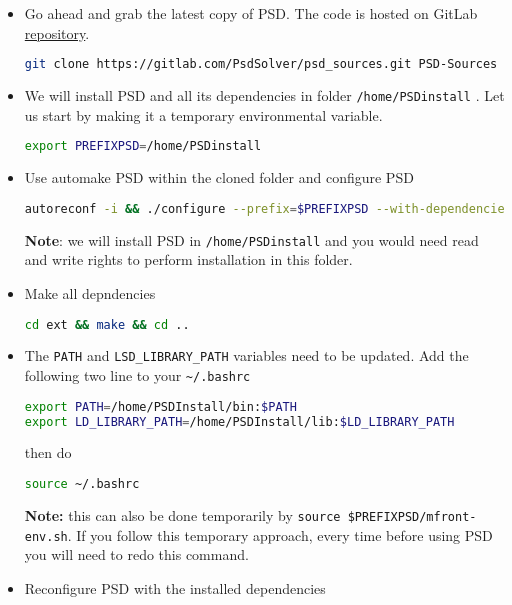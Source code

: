 \begin{itemize}
\item
  Go ahead and grab the latest copy of PSD. The code is hosted on GitLab
  \href{https://gitlab.com/PsdSolver/psd_sources}{repository}.

\begin{lstlisting}[language=bash]
git clone https://gitlab.com/PsdSolver/psd_sources.git PSD-Sources
\end{lstlisting}
\item
  We will install PSD and all its dependencies in folder
  \lstinline!/home/PSDinstall! . Let us start by making it a temporary
  environmental variable.

\begin{lstlisting}[language=bash]
export PREFIXPSD=/home/PSDinstall
\end{lstlisting}
\item
  Use automake PSD within the cloned folder and configure PSD

\begin{lstlisting}[language=bash]
autoreconf -i && ./configure --prefix=$PREFIXPSD --with-dependencies=yes
\end{lstlisting}

  \textbf{Note}: we will install PSD in \lstinline!/home/PSDinstall! and
  you would need read and write rights to perform installation in this
  folder.
\item
  Make all depndencies

\begin{lstlisting}[language=bash]
cd ext && make && cd ..
\end{lstlisting}
\item
  The \lstinline!PATH! and \lstinline!LSD_LIBRARY_PATH! variables need
  to be updated. Add the following two line to your
  \lstinline!~/.bashrc!

\begin{lstlisting}[language=bash]
export PATH=/home/PSDInstall/bin:$PATH 
export LD_LIBRARY_PATH=/home/PSDInstall/lib:$LD_LIBRARY_PATH
\end{lstlisting}

  then do

\begin{lstlisting}[language=bash]
source ~/.bashrc
\end{lstlisting}

  \textbf{Note:} this can also be done temporarily by
  \lstinline!source $PREFIXPSD/mfront-env.sh!. If you follow this
  temporary approach, every time before using PSD you will need to redo
  this command.
\item
  Reconfigure PSD with the installed dependencies


\end{itemize}
